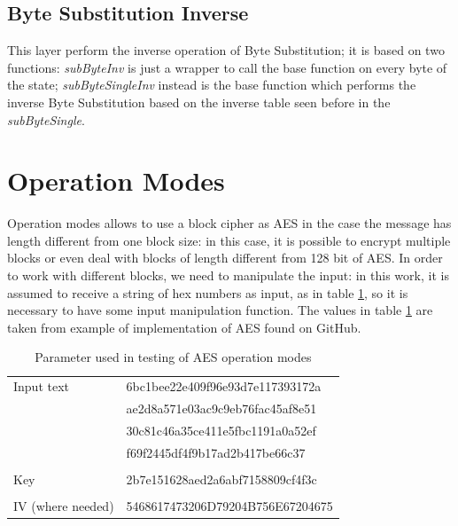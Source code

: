 \documentclass{article}
\begin{document}
\subsection{Byte Substitution Inverse}

This layer perform the inverse operation of Byte Substitution; it is based on two functions: \textit{subByteInv} is just a wrapper to call the base function on every byte of the state; \textit{subByteSingleInv} instead is the base function which performs the inverse Byte Substitution based on the inverse table seen before in the \textit{subByteSingle}.
 

\section{Operation Modes}

Operation modes allows to use a block cipher as AES in the case the message has length different from one block size: in this case, it is possible to encrypt multiple blocks or even deal with blocks of length different from 128 bit of AES. In order to work with different blocks, we need to manipulate the input: in this work, it is assumed to receive a string of hex numbers as input, as in table \ref{tab:AESparameter}, so it is necessary to have some input manipulation function.\newline
The values in table \ref{tab:AESparameter} are taken from example of implementation of AES found on GitHub.

\begin{table}[H]
\begin{center}
\begin{tabular}{ll}
Input text &  6bc1bee22e409f96e93d7e117393172a\\
	      &   ae2d8a571e03ac9c9eb76fac45af8e51\\
	      &   30c81c46a35ce411e5fbc1191a0a52ef\\
	      &   f69f2445df4f9b17ad2b417be66c37 \\
\\
Key & 2b7e151628aed2a6abf7158809cf4f3c\\
\\
IV (where needed) & 5468617473206D79204B756E67204675
\end{tabular}
\caption{Parameter used in testing of AES operation modes}
\label{tab:AESparameter}
\end{center}
\end{table}
\end{document}
